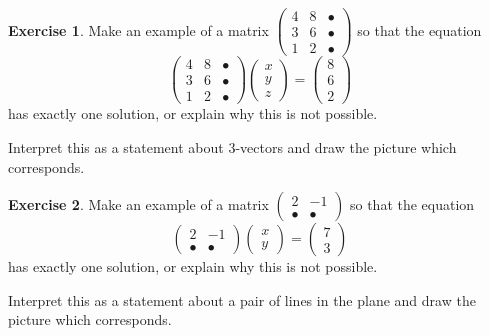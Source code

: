 \documentclass[11pt]{amsart}
\theoremstyle{definition}
\newtheorem{exercise}{Exercise}
\begin{document}
\vspace{1cm}

\begin{exercise}
Make an example of a matrix $\left(\begin{smallmatrix} 4 & 8 & \bullet \\ 3 & 6 & \bullet \\ 1 & 2 & \bullet \end{smallmatrix}\right)$ so that the equation
\[
\begin{pmatrix} 4 & 8 & \bullet \\ 3 & 6 & \bullet \\ 1 & 2 & \bullet \end{pmatrix} \begin{pmatrix} x \\ y \\ z \end{pmatrix} = \begin{pmatrix} 8 \\ 6 \\ 2 \end{pmatrix}
\]
has exactly one solution, or explain why this is not possible.

Interpret this as a statement about $3$-vectors and draw the picture which corresponds.
\end{exercise}

\vspace{1cm}

\begin{exercise}
Make an example of a matrix $\left( \begin{smallmatrix} 2 & -1 \\ \bullet & \bullet \end{smallmatrix}\right)$ so that the equation
\[
\begin{pmatrix} 2 & -1 \\ \bullet & \bullet \end{pmatrix}\begin{pmatrix} x \\ y \end{pmatrix} = \begin{pmatrix} 7 \\ 3 \end{pmatrix}
\]
has exactly one solution, or explain why this is not possible.

Interpret this as a statement about a pair of lines in the plane and draw the picture which corresponds.
\end{exercise}
\end{document}
